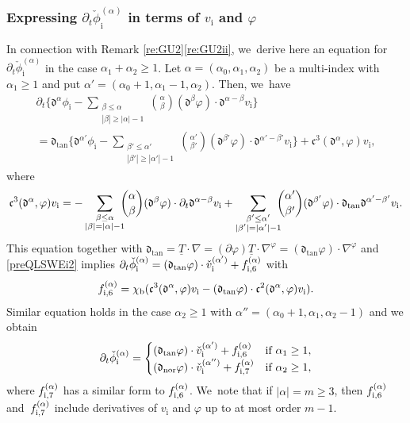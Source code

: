 \documentclass[JEP,XML,SOM,Unicode,NoFloatCountersInSection,published]{cedram}
\newcommand{\dtan}{{\mathfrak d}_\mathrm{tan}}
\newcommand{\dnor}{{\mathfrak d}_\mathrm{nor}}
\newcommand{\dt}{\partial_t}
\newcommand{\ul}[1]{\underline{#1}}
\theoremstyle{definition}
\begin{document}
\subsubsection{Expressing $\dt \check{\phi}_\mathrm{i}^{(\alpha)}$ in terms of $v_\mathrm{i}$ and $\varphi$}\label{sectexprdtphi}
In connection with Remark \ref{re:GU2}\eqref{re:GU2ii}, we~derive here an equation for $\dt\check{\phi}_\mathrm{i}^{(\alpha)}$ in the case $\alpha_1+\alpha_2\geq1$.
Let $\alpha=(\alpha_0,\alpha_1,\alpha_2)$ be a multi-index with $\alpha_1\geq1$ and put $\alpha'=(\alpha_0+1,\alpha_1-1,\alpha_2)$.
Then, we~have
\begin{multline*}
 \dt\biggl\{ \mathfrak{d}^{\alpha}\phi_\mathrm{i}
- \sum_{\substack{\beta\leq\alpha\\ |\beta|\geq|\alpha|-1}} \binom{\alpha}{\beta} (\mathfrak{d}^{\beta}\varphi)\cdot\mathfrak{d}^{\alpha-\beta}v_\mathrm{i} \biggr\} \\[-8pt]
= \dtan\biggl\{ \mathfrak{d}^{\alpha'}\phi_\mathrm{i}
- \sum_{\substack{\beta'\leq\alpha'\\ |\beta'|\geq|\alpha'|-1}} \binom{\alpha'}{\beta'} (\mathfrak{d}^{\beta'}\varphi)\cdot\mathfrak{d}^{\alpha'-\beta'}v_\mathrm{i} \biggr\}
+ {\mathfrak c}^3(\mathfrak{d}^\alpha,\varphi)v_\mathrm{i},
\end{multline*}
where
\[
{\mathfrak c}^3(\mathfrak{d}^\alpha,\varphi)v_\mathrm{i}
= - \sum_{\substack{\beta\leq\alpha\\ |\beta|=|\alpha|-1}}\hspace*{-2mm} \binom{\alpha}{\beta}(\mathfrak{d}^\beta\varphi)\cdot\dt\mathfrak{d}^{\alpha-\beta}v_\mathrm{i}
+ \sum_{\substack{\beta'\leq\alpha'\\ |\beta'|=|\alpha'|-1}} \hspace*{-2mm}\binom{\alpha'}{\beta'} (\mathfrak{d}^{\beta'}\varphi)\cdot\dtan\mathfrak{d}^{\alpha'-\beta'}v_\mathrm{i}.
\]
This equation together with $\dtan=\ul{T}\cdot\nabla=(\partial\varphi)\ul{T}\cdot\nabla^\varphi=(\dtan\varphi)\cdot\nabla^\varphi$ and \eqref{preQLSWEi2} implies
$\dt\check{\phi}_\mathrm{i}^{(\alpha)} = (\dtan\varphi)\cdot\check{v}_\mathrm{i}^{(\alpha')} + f_{{\rm i},6}^{(\alpha)}$ with
\[
f_{{\rm i},6}^{(\alpha)}
= \chi_\mathrm{b}({\mathfrak c}^3(\mathfrak{d}^\alpha,\varphi)v_\mathrm{i} - (\dtan\varphi)\cdot {\mathfrak c}^2(\mathfrak{d}^\alpha,\varphi)v_\mathrm{i}).
\]
Similar equation holds in the case $\alpha_2\geq1$ with $\alpha''=(\alpha_0+1,\alpha_1,\alpha_2-1)$ and we obtain
\begin{equation}\label{Dtphii}
\dt\check{\phi}_\mathrm{i}^{(\alpha)} =
\begin{cases}
(\dtan\varphi)\cdot\check{v}_\mathrm{i}^{(\alpha')} + f_{{\rm i},6}^{(\alpha)} &\mbox{if } \alpha_1\geq1, \\
(\dnor\varphi)\cdot\check{v}_\mathrm{i}^{(\alpha'')} + f_{{\rm i},7}^{(\alpha)} &\mbox{if } \alpha_2\geq1,
\end{cases}
\end{equation}
where $f_{{\rm i},7}^{(\alpha)}$ has a similar form to $f_{{\rm i},6}^{(\alpha)}$. We~note that if $|\alpha|=m\geq3$, then $f_{{\rm i},6}^{(\alpha)}$ and~$f_{{\rm i},7}^{(\alpha)}$ include derivatives of $v_\mathrm{i}$ and $\varphi$
up to at most order $m-1$.
\end{document}
